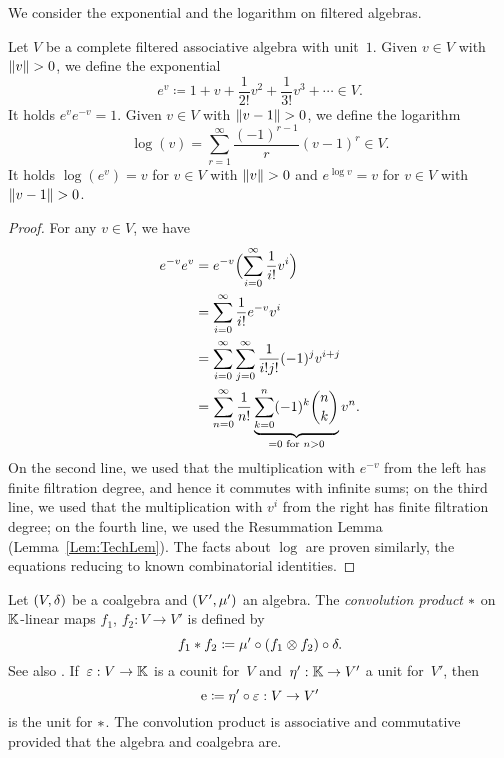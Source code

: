 \documentclass[\MainFolder/Text.tex]{subfiles}
\begin{document}
We consider the exponential and the logarithm on filtered algebras.

\begin{Lemma}\label{Lem:Exponential}
Let $V$ be a complete filtered associative algebra with unit~$1$. Given $v\in V$ with $\Norm{v}>0$, we define the exponential
$$ e^v \coloneqq 1 + v + \frac{1}{2!}v^2 + \frac{1}{3!} v^3 + \dotsb \in V. $$
It holds $e^v e^{-v} = 1$. Given $v\in V$ with $\Norm{v-1}>0$, we define the logarithm
$$ \log(v) = \sum_{r=1}^\infty \frac{(-1)^{r-1}}{r} (v-1)^{r}\in V. $$
It holds $\log(e^v) = v$ for $v\in V$ with $\Norm{v}>0$ and $e^{\log v} = v$ for $v\in V$ with $\Norm{v-1}>0$.
\end{Lemma}
\begin{proof}
For any $v\in V$, we have
\begin{align*}
e^{-v}e^v &= e^{-v}\Bigl(\sum_{i=0}^\infty \frac{1}{i!} v^i\Bigr)\\
  &=\sum_{i=0}^\infty \frac{1}{i!} e^{-v}v^i \\
  & = \sum_{i=0}^\infty \sum_{j=0}^\infty \frac{1}{i! j!}(-1)^j v^{i+j} \\
  &= \sum_{n=0}^\infty \frac{1}{n!}\underbrace{\sum_{k=0}^n (-1)^k \binom{n}{k}}_{=0\text{ for }n>0} v^n.
\end{align*}
On the second line, we used that the multiplication with $e^{-v}$ from the left has finite filtration degree, and hence it commutes with infinite sums; on the third line, we used that the multiplication with $v^i$ from the right has finite filtration degree; on the fourth line, we used the Resummation Lemma (Lemma~\ref{Lem:TechLem}). The facts about $\log$ are proven similarly, the equations reducing to known combinatorial identities.
\end{proof}

Let $(V,\delta)$ be a coalgebra and $(V',\mu')$ an algebra. The \emph{convolution product} $*$ on $\mathbb{K}$-linear maps $f_1$, $f_2: V \rightarrow V'$ is defined by
$$ f_1* f_2 \coloneqq \mu'\circ(f_1\otimes f_2)\circ\delta. $$
See also \cite[Section~1.6]{Loday2012}.
If~$\varepsilon: V \rightarrow \mathbb{K}$ is a counit for~$V$ and~$\eta': \mathbb{K} \rightarrow V'$ a unit for~$V'$, then
\begin{equation}\label{Eq:ConvUnit}
\mathrm{e} \coloneqq \eta'\circ\varepsilon: V \rightarrow V'
\end{equation}
is the unit for $*$. The convolution product is associative and commutative provided that the algebra and coalgebra are.
\end{document}
